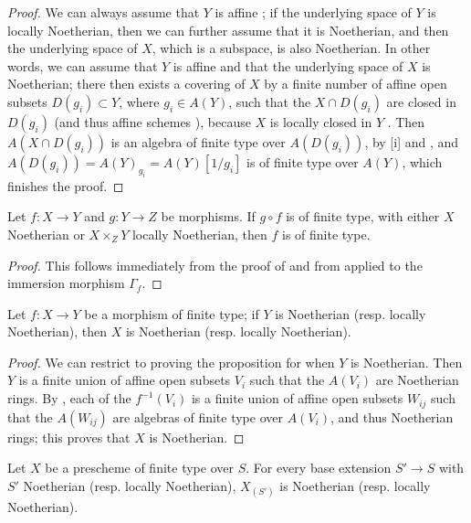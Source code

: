 \begin{proof}
We can always assume that $Y$ is affine ;
if the underlying space of $Y$ is locally Noetherian, then we can further assume that it is Noetherian, and then the underlying space of $X$, which is a subspace, is also Noetherian.
In other words, we can assume that $Y$ is affine and that the underlying space of $X$ is Noetherian;
there then exists a covering of $X$ by a finite number of affine open subsets $D(g_i)\subset Y$, where $g_i\in A(Y)$, such that the $X\cap D(g_i)$ are closed in $D(g_i)$ (and thus affine schemes ), because $X$ is locally closed in $Y$ .
Then $A(X\cap D(g_i))$ is an algebra of finite type over $A(D(g_i))$, by [i] and , and $A(D(g_i))=A(Y)_{g_i}=A(Y)[1/g_i]$ is of finite type over $A(Y)$, which finishes the proof.
\end{proof}

\begin{corollary}[6.3.6]
\label{I.6.3.6}
Let $f:X\to Y$ and $g:Y\to Z$ be morphisms.
If $g\circ f$ is of finite type, with either $X$ Noetherian or $X\times_Z Y$ locally Noetherian, then $f$ is of finite type.
\end{corollary}

\begin{proof}
This follows immediately from the proof of  and from  applied to the immersion morphism $\Gamma_f$.
\end{proof}

\begin{proposition}[6.3.7]
\label{I.6.3.7}
Let $f:X\to Y$ be a morphism of finite type;
if $Y$ is Noetherian (resp. locally Noetherian), then $X$ is Noetherian (resp. locally Noetherian).
\end{proposition}

\begin{proof}
We can restrict to proving the proposition for when $Y$ is Noetherian.
Then $Y$ is a finite union of affine open subsets $V_i$ such that the $A(V_i)$ are Noetherian rings.
By , each of the $f^{-1}(V_i)$ is a finite union of affine open subsets $W_{ij}$ such that the $A(W_{ij})$ are algebras of finite type over $A(V_i)$, and thus Noetherian rings;
this proves that $X$ is Noetherian.
\end{proof}

\begin{corollary}[6.3.8]
\label{I.6.3.8}
Let $X$ be a prescheme of finite type over $S$.
For every base extension $S'\to S$ with $S'$ Noetherian (resp. locally Noetherian), $X_{(S')}$ is Noetherian (resp. locally Noetherian).
\end{corollary}


